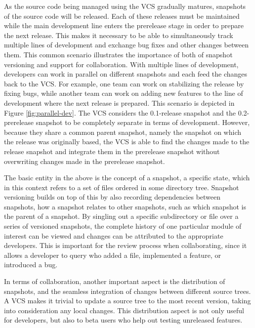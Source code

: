 As the source code being managed using the VCS gradually matures,
snapshots of the source code will be released. Each of these releases
must be maintained while the main development line enters the
prerelease stage in order to prepare the next release. This makes it
necessary to be able to simultaneously track multiple lines of
development and exchange bug fixes and other changes between them.
This common scenario illustrates the importance of both of snapshot
versioning and support for collaboration. With multiple lines of
development, developers can work in parallel on different snapshots
and each feed the changes back to the VCS. For example, one team can
work on stabilizing the release by fixing bugs, while another team can
work on adding new features to the line of development where the next
release is prepared. This scenario is depicted in Figure
\ref{fig:parallel-dev}.  The VCS considers the 0.1-release snapshot
and the 0.2-prerelease snapshot to be completely separate in terms of
development. However, because they share a common parent snapshot,
namely the snapshot on which the release was originally based, the VCS
is able to find the changes made to the release snapshot and integrate
them in the prerelease snapshot without overwriting changes made in
the prerelease snapshot.

The basic entity in the above is the concept of a snapshot, a specific
state, which in this context refers to a set of files ordered in some
directory tree. Snapshot versioning builds on top of this by also
recording dependencies between snapshots, how a snapshot relates to
other snapshots, such as which snapshot is the parent of a snapshot.
By singling out a specific subdirectory or file over a series
of versioned snapshots, the complete history of one particular module
of interest can be viewed and changes can be attributed to the
appropriate developers. This is important for the review process when
collaborating, since it allows a developer to query who added a file,
implemented a feature, or introduced a bug.

In terms of collaboration, another important aspect is the
distribution of snapshots, and the seamless integration of changes
between different source trees. A VCS makes it trivial to update a
source tree to the most recent version, taking into consideration any
local changes. This distribution aspect is not only useful for
developers, but also to beta users who help out testing unreleased
features.


